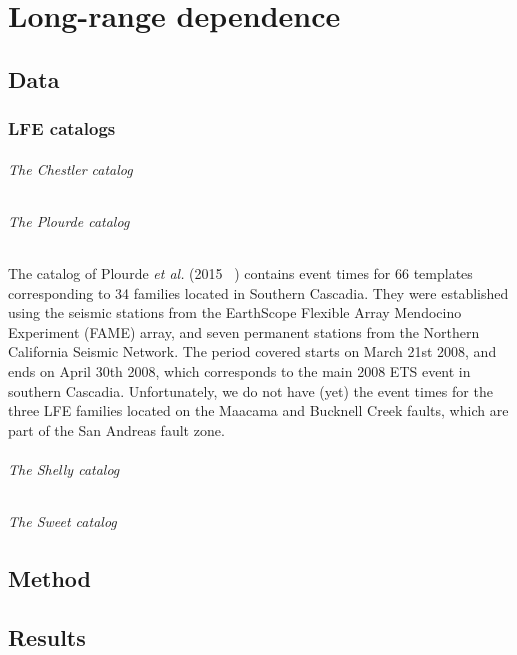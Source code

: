 \documentclass[main.tex]{subfiles}
\begin{document}
\part{Long-range dependence}

\chapter{Data}

\section{LFE catalogs}

\paragraph{The Chestler catalog}

\paragraph{The Plourde catalog} The catalog of Plourde \textit{et al.} (2015 ~\cite{PLO_2015}) contains event times for 66 templates corresponding to 34 families located in Southern Cascadia. They were established using the seismic stations from the EarthScope Flexible Array Mendocino Experiment (FAME) array, and seven permanent stations from the Northern California Seismic Network. The period covered starts on March 21st 2008, and ends on April 30th 2008, which corresponds to the main 2008 ETS event in southern Cascadia. Unfortunately, we do not have (yet) the event times for the three LFE families located on the Maacama and Bucknell Creek faults, which are part of the San Andreas fault zone.

\paragraph{The Shelly catalog}

\paragraph{The Sweet catalog}

\chapter{Method}

\chapter{Results}
\end{document}
